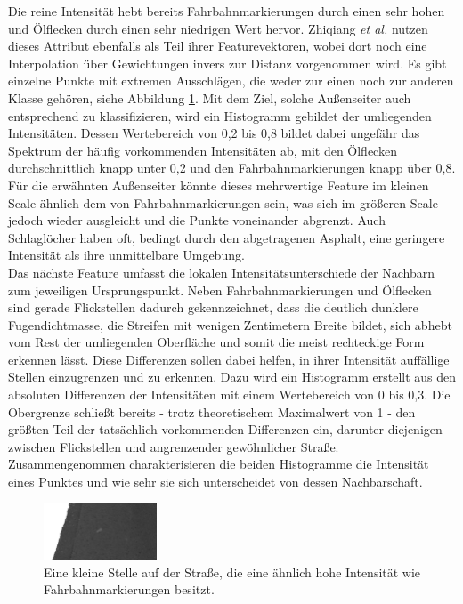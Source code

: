 Die reine Intensität hebt bereits Fahrbahnmarkierungen durch einen sehr hohen und Ölflecken durch einen sehr niedrigen Wert hervor. Zhiqiang \textit{et al.} \cite{Zhiqiang.etal-2019} nutzen dieses Attribut ebenfalls als Teil ihrer Featurevektoren, wobei dort noch eine Interpolation über Gewichtungen invers zur Distanz vorgenommen wird. Es gibt einzelne Punkte mit extremen Ausschlägen, die weder zur einen noch zur anderen Klasse gehören, siehe Abbildung \ref{fig:fake_road_marking}. Mit dem Ziel, solche Außenseiter auch entsprechend zu klassifizieren, wird ein Histogramm gebildet der umliegenden Intensitäten. Dessen Wertebereich von 0,2 bis 0,8 bildet dabei ungefähr das Spektrum der häufig vorkommenden Intensitäten ab, mit den Ölflecken durchschnittlich knapp unter 0,2 und den Fahrbahnmarkierungen knapp über 0,8. Für die erwähnten Außenseiter könnte dieses mehrwertige Feature im kleinen Scale ähnlich dem von Fahrbahnmarkierungen sein, was sich im größeren Scale jedoch wieder ausgleicht und die Punkte voneinander abgrenzt. Auch Schlaglöcher haben oft, bedingt durch den abgetragenen Asphalt, eine geringere Intensität als ihre unmittelbare Umgebung. \\
Das nächste Feature umfasst die lokalen Intensitätsunterschiede der Nachbarn zum jeweiligen Ursprungspunkt. Neben Fahrbahnmarkierungen und Ölflecken sind gerade Flickstellen dadurch gekennzeichnet, dass die deutlich dunklere Fugendichtmasse, die Streifen mit wenigen Zentimetern Breite bildet, sich abhebt vom Rest der umliegenden Oberfläche und somit die meist rechteckige Form erkennen lässt. Diese Differenzen sollen dabei helfen, in ihrer Intensität auffällige Stellen einzugrenzen und zu erkennen. Dazu wird ein Histogramm erstellt aus den absoluten Differenzen der Intensitäten mit einem Wertebereich von 0 bis 0,3. Die Obergrenze schließt bereits - trotz theoretischem Maximalwert von 1 - den größten Teil der tatsächlich vorkommenden Differenzen ein, darunter diejenigen zwischen Flickstellen und angrenzender gewöhnlicher Straße. \\
Zusammengenommen charakterisieren die beiden Histogramme die Intensität eines Punktes und wie sehr sie sich unterscheidet von dessen Nachbarschaft.

\begin{figure}[!ht]
    \centering
    \includegraphics[width=0.3\textwidth]{graphics/fake_road_marking}
    \caption{Eine kleine Stelle auf der Straße, die eine ähnlich hohe Intensität wie Fahrbahnmarkierungen besitzt.}
    \label{fig:fake_road_marking}
\end{figure}

